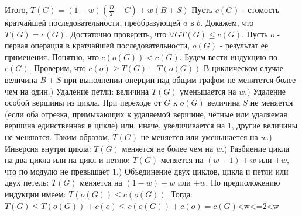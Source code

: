 \documentclass[a4paper,12pt]{article}
\begin{document}
Итого, $T(G) = (1 - w)(\frac{D}{2} - C) + w(B + S)$\newline
Пусть $c(G)$ - стомость кратчайшей последовательности, преобразующей $a$ в $b$.\newline
Докажем, что $T(G) = c(G)$. Достаточно проверить, что $\forall G T(G)\le c(G)$. Пусть $o$ - первая операция
в кратчайшей последовательности, $o(G)$ - результат её применения. Понятно, что $c(o(G)) < c(G)$. Будем вести
индукцию по $c(G)$.\newline
Проверим, что $c(o)\ge T(G) - T(o(G))$\newline
В циклическом случае величина $B + S$ при выполнении оперции над общим графом не менятется более чем на
один.) Удаление петли: величина $T(G)$ уменьшается на $w$.) Удаление особой вершины из цикла. При переходе от $G$ к $o(G)$ величина $S$ не меняется (если оба отрезка,
примыкающих к удаляемой вершине, чётные или удаляемая вершина единственная в цикле) или, иначе, увеличивается
на $1$, другие величины не меняются. Таким образом, $T(G)$ не меняется или уменьшается на $w$.) Инверсия внутри цикла: $T(G)$ меняется не более чем на $w$.) Разбиение цикла на два цикла или на цикл и петлю: $T(G)$ меняется на $(w - 1)\pm w$ или $\pm w$, что по
модулю не превышает $1$.) Объединение двух циклов, цикла и петли или двух петель: $T(G)$ меняется на $(1 - w)\pm w$ или
$\pm w$.\newline
По предположению индукции имеем:\newline
$T(o(G)) \le c(o(G))$. Тогда: $T(G)\le T(o(G)) + c(o)\le c(o(G)) + c(o) = c(G)$<w<=2<w\newline
\end{document}
